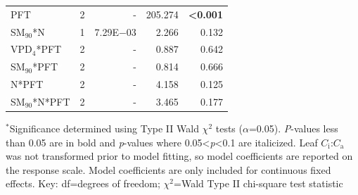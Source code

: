\begin{table}
\begin{tabular}{p{6cm}p{0.5cm}p{2cm}p{1.5cm}p{1.5cm}}
            PFT
            & \multicolumn{1}{r}{2}
            & \multicolumn{1}{r}{-}
            & \multicolumn{1}{r}{205.274}
            & \multicolumn{1}{r}{\textbf{<0.001}}
            \\

            SM$_{90}$*N
            & \multicolumn{1}{r}{1}
            & \multicolumn{1}{r}{7.29E$-$03} %
            & \multicolumn{1}{r}{2.266}
            & \multicolumn{1}{r}{0.132}
            \\

            VPD$_{4}$*PFT
            & \multicolumn{1}{r}{2}
            & \multicolumn{1}{r}{-}
            & \multicolumn{1}{r}{0.887}
            & \multicolumn{1}{r}{0.642}
            \\

            SM$_{90}$*PFT
            & \multicolumn{1}{r}{2}
            & \multicolumn{1}{r}{-}
            & \multicolumn{1}{r}{0.814}
            & \multicolumn{1}{r}{0.666}
            \\

            N*PFT
            & \multicolumn{1}{r}{2}
            & \multicolumn{1}{r}{-}
            & \multicolumn{1}{r}{4.158}
            & \multicolumn{1}{r}{0.125}
            \\

            SM$_{90}$*N*PFT
            & \multicolumn{1}{r}{2}
            & \multicolumn{1}{r}{-}
            & \multicolumn{1}{r}{3.465}
            & \multicolumn{1}{r}{0.177}
            \\
            \hline
        \end{tabular}%
    \label{tab:table4.3}
\end{table}
\begin{singlespace}
    \noindent $^*$Significance determined using Type II Wald $\chi^{2}$ tests ($\alpha$=0.05). \textit{P}-values less than 0.05 are in bold and \textit{p}-values where 0.05<\textit{p}<0.1 are italicized. Leaf $C_\mathrm{i}$:$C_\mathrm{a}$ was not transformed prior to model fitting, so model coefficients are reported on the response scale. Model coefficients are only included for continuous fixed effects. Key: df=degrees of freedom; $\chi^2$=Wald Type II chi-square test statistic
\end{singlespace}
\clearpage


